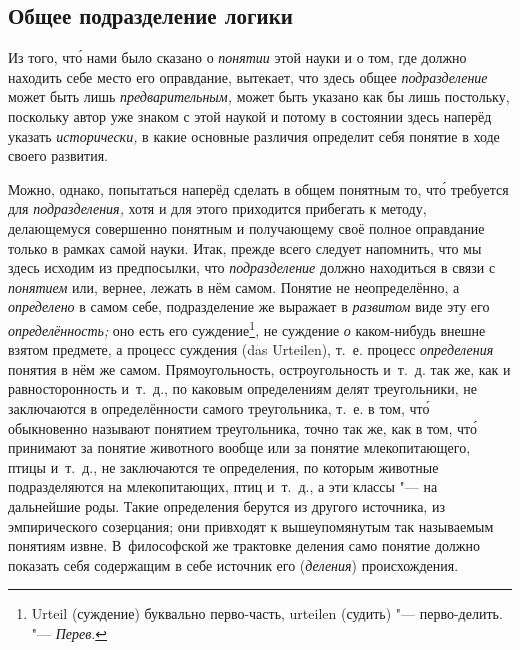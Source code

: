 \subsection[\hspace{8mm}Общее подразделение логики]{Общее подразделение логики}
Из того, чт\'{о} нами было сказано о
{\em понятии} этой науки и о том, где должно находить
себе место его оправдание, вытекает, что здесь общее
{\em подразделение} может быть лишь
{\em предварительным,} может быть указано как бы лишь
постольку, поскольку автор уже знаком с этой наукой и потому в состоянии
здесь наперёд указать {\em исторически,} в какие
основные различия определит себя понятие в ходе своего развития.

Можно, однако, попытаться наперёд сделать в общем понятным то, чт\'{о} требуется
для {\em подразделения,} хотя и для этого приходится
прибегать к методу, делающемуся совершенно понятным и получающему своё
полное оправдание только в рамках самой науки. Итак, прежде всего следует
напомнить, что мы здесь исходим из предпосылки, что
{\em подразделение} должно находиться в связи с
{\em понятием} или, вернее, лежать в нём самом. Понятие
не неопределённо, а {\em определено} в самом себе,
подразделение же выражает в {\em развитом} виде эту его
{\em определённость;} оно есть его суждение\footnote{
Urteil (суждение) буквально перво-часть, urteilen (судить) "--- перво-делить.
"--- {\em Перев}.}, не суждение {\em о} каком-нибудь
внешне взятом предмете, а процесс суждения (das Urteilen), т.~е. процесс
{\em определения} понятия в нём же самом.
Прямоугольность, остроугольность и~т.~д. так же, как и равносторонность
и~т.~д., по каковым определениям делят треугольники, не заключаются в
определённости самого треугольника, т.~е. в том, чт\'{о} обыкновенно называют
понятием треугольника, точно так же, как в том, чт\'{о} принимают за понятие
животного вообще или за понятие млекопитающего, птицы и~т.~д., не
заключаются те определения, по которым животные подразделяются на
млекопитающих, птиц и~т.~д., а эти классы "--- на дальнейшие роды. Такие
определения берутся из другого источника, из эмпирического созерцания; они
привходят к вышеупомянутым так называемым понятиям извне. В~философской же
трактовке деления само понятие должно показать себя содержащим в себе
источник его ({\em деления}) происхождения.

